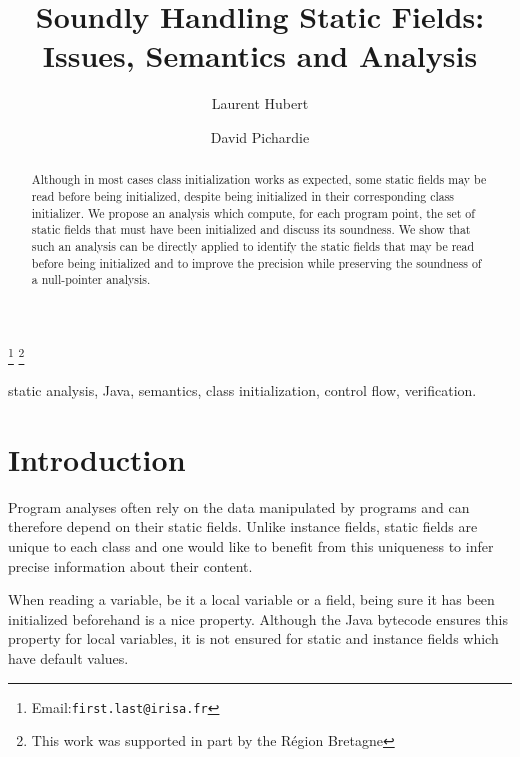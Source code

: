 \documentclass{entcs}
\begin{document}
\begin{frontmatter}
\title{Soundly Handling Static Fields:\\
    Issues, Semantics and Analysis}

  \author[CnrsIrisa]{Laurent
    Hubert}
  \author[InriaIrisa]{David Pichardie}

  \address[CnrsIrisa]{CNRS, IRISA, Campus Beaulieu , F-35042 Rennes
    Cedex, France}\address[InriaIrisa]{INRIA, Centre Rennes --- Bretagne Atlantique\\
    IRISA, Campus Beaulieu , F-35042 Rennes Cedex, France}


  \thanks[email]{Email:\texttt{first.last@irisa.fr}}
  \thanks[regionbretagne]{This work was supported in part by the
    Région Bretagne}

  \begin{abstract}
Although in most cases class initialization works as expected,
    some static fields may be read before being initialized, despite
    being initialized in their corresponding class initializer.
We propose an analysis which compute, for each program point, the
    set of static fields that must have been initialized and discuss
    its soundness.
We show that such an analysis can be directly applied to identify
    the static fields that may be read before being initialized and to
    improve the precision while preserving the soundness of a
    null-pointer analysis.
  \end{abstract}

  \begin{keyword}
    static analysis, Java, semantics, class initialization, control
    flow, verification.
  \end{keyword}
\end{frontmatter}


\section{Introduction}
\label{sec:introduction}

Program analyses often rely on the data manipulated by programs and
can therefore depend on their static fields.  Unlike instance fields,
static fields are unique to each class and one would like to benefit
from this uniqueness to infer precise information about their content.

When reading a variable, be it a local variable or a field, being sure
it has been initialized beforehand is a nice property.  Although the
Java bytecode ensures this property for local variables, it is not
ensured for static and instance fields which have default values.
\end{document}
